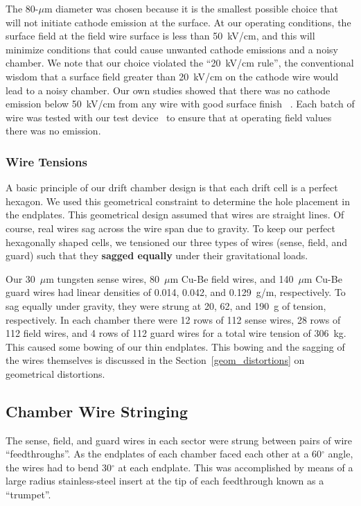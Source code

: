 The 80-$\mu$m diameter was chosen because it is the smallest possible choice
that will not initiate cathode emission at the surface.
At our operating conditions, the surface field at the field wire
surface is less than 50~kV/cm, and this will minimize 
conditions that could cause unwanted cathode emissions and a noisy chamber.  
We note that our choice violated the ``20~kV/cm rule'', the conventional wisdom that
a surface field greater than 20~kV/cm on the cathode wire would lead to 
a noisy chamber. Our own studies showed that there was no cathode emission below
50~kV/cm from any wire with good surface finish~\cite{cathode-emission} .  Each batch
of wire was tested with our test device~\cite{patent} to ensure that at operating field 
values there was no emission.  

\subsubsection{Wire Tensions}

A basic principle of our drift chamber design is that each drift cell is a perfect hexagon.
We used this geometrical constraint to determine the hole placement in the endplates.
This geometrical design assumed that wires are straight lines.  Of course, real wires
sag across the wire span due to gravity.  To keep our perfect hexagonally shaped cells,
we tensioned our three types of wires (sense, field, and guard) such that they
{\bf sagged equally} under their gravitational loads.

Our 30~$\mu$m tungsten sense wires, 80~$\mu$m Cu-Be field wires, and 140~$\mu$m Cu-Be guard
wires had linear densities of 0.014, 0.042, and 0.129~g/m, respectively.  To sag equally
under gravity, they were strung at 20, 62, and 190~g of tension, respectively.
In each chamber there were 12 rows of 112 sense wires, 28 rows of 112 field wires,
and 4 rows of 112 guard wires for a total wire tension of 306~kg.
This caused some bowing of our thin endplates. This bowing and the sagging
of the wires themselves is discussed in the Section~\ref{geom_distortions} on geometrical distortions.

\subsection{Chamber Wire Stringing}

The sense, field, and guard wires in each 
sector were strung between pairs of wire ``feedthroughs''.  As the endplates of 
each chamber faced each other at a 60$^{\circ}$ angle, the wires had to bend 
30$^{\circ}$ at each endplate.  This was accomplished by means of a large radius 
stainless-steel insert at the tip of each feedthrough known as a ``trumpet''.

